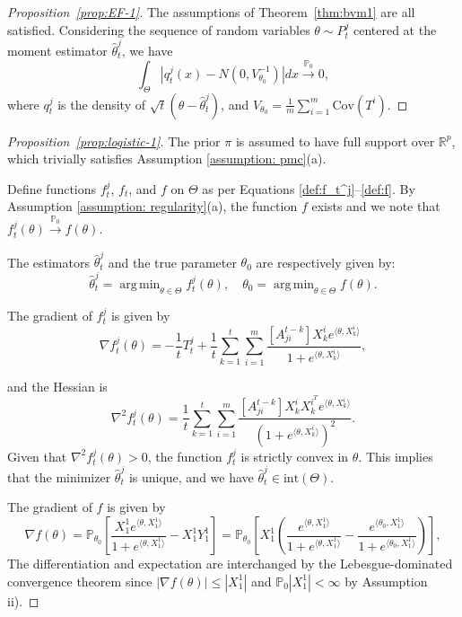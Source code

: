 \documentclass[twoside,11pt]{article}
\numberwithin{equation}{section}
\newcommand{\R}{{\mathbb{R}}}
\newcommand\bP{\mathbb{P}}
\newcommand{\pto}{\stackrel{\bP_0}{\to}}
\DeclareMathOperator*{\argmin}{arg\,min}
\begin{document}
{\begin{proof}[Proposition~\ref{prop:EF-1}]
The assumptions of Theorem~\ref{thm:bvm1} are all satisfied. Considering the sequence of random variables $\theta \sim P_t^j$ centered at the moment estimator $\hat \theta_t^j$, we have 
\begin{equation*}
    \int_\Theta |q_t^j(x) - N(0, V_{\theta_0}^{-1})| dx \pto 0, 
\end{equation*}
where $q_t^j$ is the density of $\sqrt{t}(\theta -\hat \theta_t^j)$, and $V_{\theta_0} = \frac{1}{m} \sum_{i = 1}^m \text{Cov}(T^i)$.  
\end{proof}

\begin{proof}[Proposition~\ref{prop:logistic-1}]
The prior $\pi$ is assumed to have full support over $\R^p$, which trivially satisfies Assumption \ref{assumption: pmc}(a).

Define functions $f_t^j$, $f_t$, and $f$ on $\Theta$ as per Equations \eqref{def:f_t^j}--\eqref{def:f}. By Assumption \eqref{assumption: regularity}(a), the function $f$ exists and we note that $f_t^j(\theta) \pto f(\theta)$.

The estimators $\hat \theta_t^j$ and the true parameter $\theta_0$ are respectively given by:
\begin{equation*}
    \hat \theta_t^j = \argmin_{\theta \in \Theta} f_t^j(\theta), \quad \theta_0 = \argmin_{\theta \in \Theta} f(\theta).
\end{equation*}

The gradient of $f_t^j$ is given by
\begin{equation*}
    \nabla  f_t^j(\theta) = -\frac{1}{t} T_t^j + \frac{1}{t}  \sum_{k = 1}^t \sum_{i = 1}^m \frac{ [A^{t-k}_{ji}] X_k^i e^{\langle \theta,  X_k^i \rangle}}{1 + e^{\langle \theta,  X_k^i \rangle}},
\end{equation*}

and the Hessian is
\begin{equation*}
    \nabla^2 f_t^j(\theta) = \frac{1}{t}  \sum_{k = 1}^t \sum_{i = 1}^m \frac{ [A^{t-k}_{ji}] X_k^i X_k^{i^T} e^{\langle \theta,  X_k^i \rangle}}{\left(1 + e^{\langle \theta,  X_k^i \rangle} \right)^2}.
\end{equation*}
Given that $\nabla^2 f_t^j(\theta) > 0$, the function $f_t^j$ is strictly convex in $\theta$. This implies that the minimizer $\hat \theta_t^j$ is unique, and we have $\hat \theta_t^j \in \text{int}(\Theta)$. 

The gradient of $f$ is given by
\begin{equation*}
    \nabla  f(\theta) = \bP_{\theta_0}\left[\frac{X_1^1 e^{\langle \theta,  X_1^1 \rangle}}{1 + e^{\langle \theta,  X_1^1 \rangle}} - X_1^1 Y_1^1 \right] =  \bP_{\theta_0}\left[X_1^1 \left( \frac{e^{\langle \theta,  X_1^1 \rangle}}{1 + e^{\langle \theta,  X_1^1 \rangle}} - \frac{e^{\langle \theta_0,  X_1^1 \rangle}}{1 + e^{\langle \theta_0,  X_1^1 \rangle}}\right) \right],
\end{equation*}
The differentiation and expectation are interchanged by the Lebesgue-dominated convergence theorem since $ |\nabla f(\theta)| \leq |X_1^1|$ and $\bP_0 |X_1^1| < \infty$ by Assumption ii).


\end{proof}}
\end{document}
